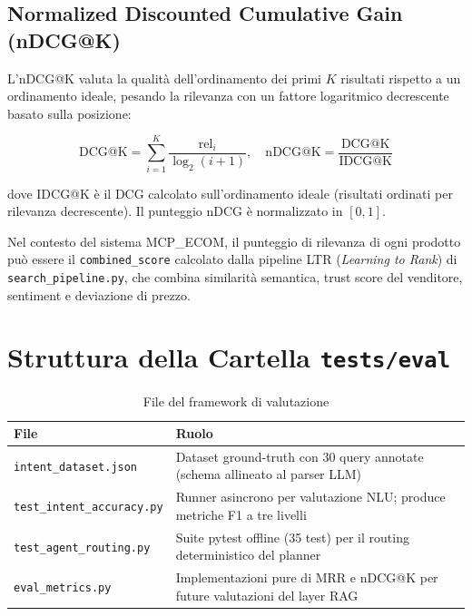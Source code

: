 \subsection{Normalized Discounted Cumulative Gain (nDCG@K)}
\label{subsec:ndcg}

L'nDCG@K valuta la qualità dell'ordinamento dei primi $K$ risultati
rispetto a un ordinamento ideale, pesando la rilevanza con un fattore
logaritmico decrescente basato sulla posizione:

\[
\text{DCG@K} = \sum_{i=1}^{K} \frac{\text{rel}_i}{\log_2(i+1)}, \quad
\text{nDCG@K} = \frac{\text{DCG@K}}{\text{IDCG@K}}
\]

dove IDCG@K è il DCG calcolato sull'ordinamento ideale (risultati
ordinati per rilevanza decrescente). Il punteggio nDCG è normalizzato
in $[0, 1]$.

Nel contesto del sistema MCP\_ECOM, il punteggio di rilevanza di ogni
prodotto può essere il \texttt{combined\_score} calcolato dalla
pipeline LTR (\emph{Learning to Rank}) di \texttt{search\_pipeline.py},
che combina similarità semantica, trust score del venditore, sentiment
e deviazione di prezzo.

\section{Struttura della Cartella \texttt{tests/eval}}
\label{sec:eval-structure}

\begin{table}[htbp]
\centering
\caption{File del framework di valutazione}
\label{tab:eval-files}
\begin{tabular}{lp{8cm}}
\toprule
\textbf{File} & \textbf{Ruolo} \\
\midrule
\texttt{intent\_dataset.json}      & Dataset ground-truth con 30 query annotate
                                     (schema allineato al parser LLM) \\
\texttt{test\_intent\_accuracy.py} & Runner asincrono per valutazione NLU;
                                     produce metriche F1 a tre livelli \\
\texttt{test\_agent\_routing.py}   & Suite pytest offline (35 test) per
                                     il routing deterministico del planner \\
\texttt{eval\_metrics.py}          & Implementazioni pure di MRR e nDCG@K
                                     per future valutazioni del layer RAG \\
\bottomrule
\end{tabular}
\end{table}

